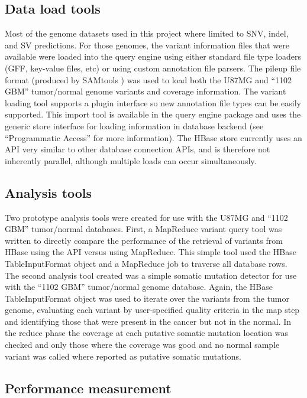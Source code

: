 \documentclass[10pt]{bmc_article}
\newenvironment{bmcformat}{\begin{raggedright}\baselineskip20pt\sloppy\setboolean{publ}{false}}{\end{raggedright}\baselineskip20pt\sloppy}
\begin{document}
\begin{bmcformat}
\subsection*{Data load tools}

Most of the genome datasets used in this project where limited to SNV, indel, and SV predictions. For those genomes, the variant information files that were available were loaded into the query engine using either standard file type loaders (GFF, key-value files, etc) or using custom annotation file parsers. The pileup file format (produced by SAMtools \cite{li2009sequence}) was used to load both the U87MG and “1102 GBM” tumor/normal genome variants and coverage information. The variant loading tool supports a plugin interface so new annotation file types can be easily supported. This import tool is available in the query engine package and uses the generic store interface for loading information in database backend (see “Programmatic Access” for more information). The HBase store currently uses an API very similar to other database connection APIs, and is therefore not inherently parallel, although multiple loads can occur simultaneously. 

\subsection*{Analysis tools}

Two prototype analysis tools were created for use with the U87MG and “1102 GBM” tumor/normal databases. First, a MapReduce variant query tool was written to directly compare the performance of the retrieval of variants from HBase using the API versus using MapReduce. This simple tool used the HBase TableInputFormat object and a MapReduce job to traverse all database rows. The second analysis tool created was a simple somatic mutation detector for use with the “1102 GBM” tumor/normal genome database. Again, the HBase TableInputFormat object was used to iterate over the variants from the tumor genome, evaluating each variant by user-specified quality criteria in the map step and identifying those that were present in the cancer but not in the normal. In the reduce phase the coverage at each putative somatic mutation location was checked and only those where the coverage was good and no normal sample variant was called where reported as putative somatic mutations.

\subsection*{Performance measurement}


\end{bmcformat}
\end{document}
